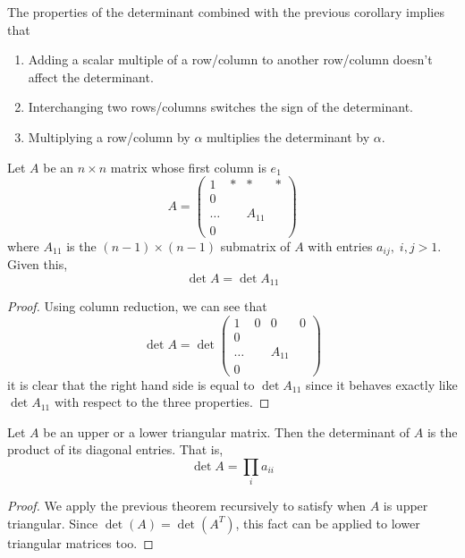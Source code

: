 \documentclass{article}
\begin{document}
  \begin{proposition}
  The properties of the determinant combined with the previous corollary implies that 
  \begin{enumerate}
      \item Adding a scalar multiple of a row/column to another row/column doesn't affect the determinant. 
      \item Interchanging two rows/columns switches the sign of the determinant. 
      \item Multiplying a row/column by $\alpha$ multiplies the determinant by $\alpha$. 
  \end{enumerate}
  \end{proposition}

  \begin{theorem}
  Let $A$ be an $n \times n$ matrix whose first column is $e_1$
  \[A = \begin{pmatrix}
  1&*&*&* \\
  0 &&& \\
  \ldots& & A_{11}& \\
  0&&&
  \end{pmatrix}\]
  where $A_{11}$ is the $(n-1) \times (n-1)$ submatrix of $A$ with entries $a_{i j}, \; i, j > 1$. Given this, 
  \[\det{A} = \det{A_{11}}\]
  \end{theorem}
  \begin{proof}
  Using column reduction, we can see that 
  \[ \det{A} = \det{\begin{pmatrix}
  1&0&0&0 \\
  0 &&& \\
  \ldots& & A_{11}& \\
  0&&&
  \end{pmatrix}}\]
  it is clear that the right hand side is equal to $\det{A_{11}}$ since it behaves exactly like $\det{A_{11}}$ with respect to the three properties. 
  \end{proof}

  \begin{corollary}
  Let $A$ be an upper or a lower triangular matrix. Then the determinant of $A$ is the product of its diagonal entries. That is,  
  \[ \det{A} = \prod_{i} a_{i i}\]
  \end{corollary}
  \begin{proof}
  We apply the previous theorem recursively to satisfy when $A$ is upper triangular. Since $\det{(A)} = \det{(A^T)}$, this fact can be applied to lower triangular matrices too. 
  \end{proof}
\end{document}
